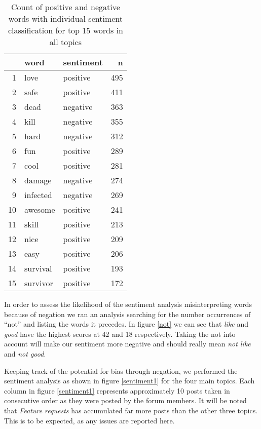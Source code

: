 \documentclass{ewic}
\begin{document}
\begin{table}[h]
\centering \scriptsize
\begin{tabular}{rllr}
  \hline
 & word & sentiment & n \\ 
  \hline
1 & love & positive & 495 \\ 
  2 & safe & positive & 411 \\ 
  3 & dead & negative & 363 \\ 
  4 & kill & negative & 355 \\ 
  5 & hard & negative & 312 \\ 
  6 & fun & positive & 289 \\ 
  7 & cool & positive & 281 \\ 
  8 & damage & negative & 274 \\ 
  9 & infected & negative & 269 \\ 
  10 & awesome & positive & 241 \\ 
  11 & skill & positive & 213 \\ 
  12 & nice & positive & 209 \\ 
  13 & easy & positive & 206 \\ 
  14 & survival & positive & 193 \\ 
  15 & survivor & positive & 172 \\ 
   \hline
\end{tabular} \normalsize
 \caption{Count of positive and negative words with individual sentiment classification for top 15 words  in all topics}
 \label{table2}
\end{table}

In order to assess the likelihood of the sentiment analysis misinterpreting words because of negation we ran an analysis searching for the number occurrences of ``not'' and listing the words it precedes. In figure \ref{not} we can see that {\it like} and {\it good} have the highest scores at 42 and 18 respectively. Taking the not into account will make our sentiment more negative and should really mean {\it not like} and {\it not good}. 


Keeping track of the potential for bias through negation, we performed the sentiment analysis as shown in figure \ref{sentiment1} for the four main topics. Each column in figure \ref{sentiment1} represents approximately 10 posts taken in consecutive order as they were posted by the forum members. It will be noted that {\it Feature requests} has accumulated far more posts than the other three topics. This is to be expected, as any issues are reported here.
\end{document}
